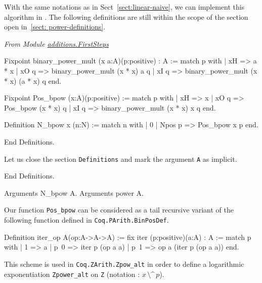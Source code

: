 With the same notations as in Sect~\vref{sect:linear-naive}, we can implement this algorithm in \gallina. The following definitions are still within the scope of the 
section open in~\vref{sect: power-definitions}.



\label{polymorhic-binary_exp}


\vspace{4pt}

\emph{From Module
\href{../theories/html/hydras.additions.FirstSteps.html}{additions.FirstSteps}}


\begin{Coqsrc}
Fixpoint binary_power_mult (x a:A)(p:positive) : A 
  :=
  match p with
    | xH =>  a * x
    | xO q => binary_power_mult  (x * x) a q
    | xI q =>  binary_power_mult  (x * x) (a * x) q
  end.

Fixpoint Pos_bpow (x:A)(p:positive) :=
 match p with
  | xH => x
  | xO q => Pos_bpow  (x * x) q
  | xI q => binary_power_mult   (x * x) x q
end.

Definition N_bpow x (n:N) := 
  match n with 
  | 0%
  | Npos p => Pos_bpow x p
  end.

End Definitions.
\end{Coqsrc}




Let us  close the section \texttt{Definitions} and mark the argument \texttt{A} as implicit.

\begin{Coqsrc}
End Definitions.

Arguments N_bpow {A}.
Arguments power {A}.
\end{Coqsrc}


\begin{remark}
Our function \texttt{Pos\_bpow} can be considered as a tail recursive variant
of the following function defined in \texttt{Coq.PArith.BinPosDef}.



\begin{Coqsrc}
Definition iter_op {A}(op:A->A->A) :=
  fix iter (p:positive)(a:A) : A :=
  match p with
    | 1 => a
    | p~0 => iter p (op a a)
    | p~1 => op a (iter p (op a a))
  end.
\end{Coqsrc}

This scheme is used in \texttt{Coq.ZArith.Zpow\_alt} in order to define a logarithmic exponentiation \texttt{Zpower\_alt} on \texttt{Z} (notation : $x\,\texttt{\^{}\^{}}\,p$).

\end{remark}

